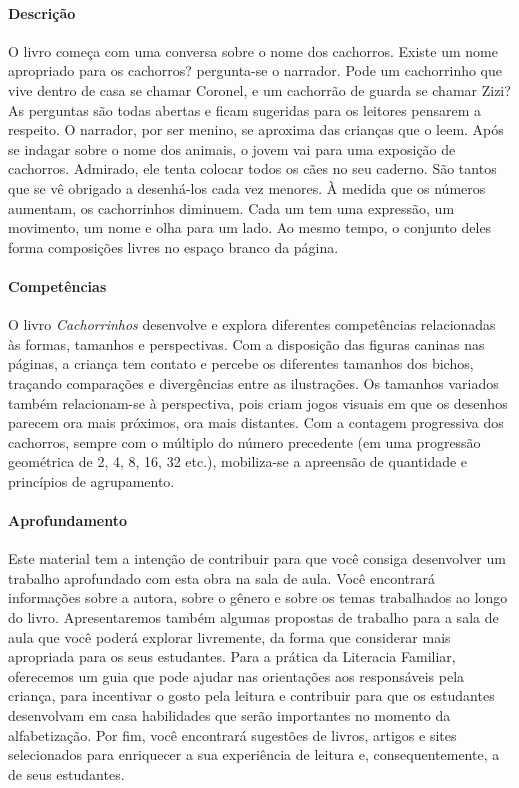 \documentclass[11pt]{extarticle}
\begin{document}
\paragraph{Descrição} O livro começa com uma conversa sobre o nome dos cachorros. Existe um nome apropriado para os cachorros? pergunta-se o narrador. Pode um cachorrinho que vive dentro de casa se chamar Coronel, e um cachorrão de guarda se chamar Zizi? As perguntas são todas abertas e ficam sugeridas para os leitores pensarem a respeito. O narrador, por ser menino, se aproxima das crianças que o leem. Após se indagar sobre o nome dos animais, o jovem vai para uma exposição de cachorros. Admirado, ele tenta colocar todos os cães no
seu caderno. São tantos que se vê obrigado a desenhá-los cada vez menores. À medida que os
números aumentam, os cachorrinhos diminuem. Cada um tem uma expressão, um
movimento, um nome e olha para um lado. Ao mesmo tempo, o conjunto deles forma
composições livres no espaço branco da página.

\paragraph{Competências}
O livro \textit{Cachorrinhos} desenvolve e explora diferentes competências relacionadas às formas, tamanhos e perspectivas. Com a disposição das figuras caninas nas páginas, a criança tem contato e percebe os diferentes tamanhos dos bichos, traçando comparações e divergências entre as ilustrações. Os tamanhos variados também relacionam-se à perspectiva, pois criam jogos visuais em que os desenhos parecem ora mais próximos, ora mais distantes. Com a contagem progressiva dos cachorros, sempre com o múltiplo do número precedente (em uma progressão geométrica de 2, 4, 8, 16, 32 etc.), mobiliza-se a apreensão de quantidade e princípios de agrupamento.


\paragraph{Aprofundamento} Este material tem a 
intenção de contribuir para que você consiga desenvolver um trabalho aprofundado 
com esta obra na sala de aula. Você encontrará informações sobre a autora, sobre 
o gênero e sobre os temas trabalhados ao longo do livro. Apresentaremos também 
algumas propostas de trabalho para a sala de aula que você poderá explorar livremente, 
da forma que considerar mais apropriada para os seus estudantes. Para a prática 
da Literacia Familiar, oferecemos um guia que pode ajudar nas orientações aos 
responsáveis pela criança, para incentivar o gosto pela leitura e contribuir para 
que os estudantes desenvolvam em casa habilidades que serão importantes no momento 
da alfabetização. Por fim, você encontrará sugestões de livros, artigos e sites 
selecionados para enriquecer a sua experiência de leitura e, 
consequentemente, a de seus estudantes.
\end{document}
